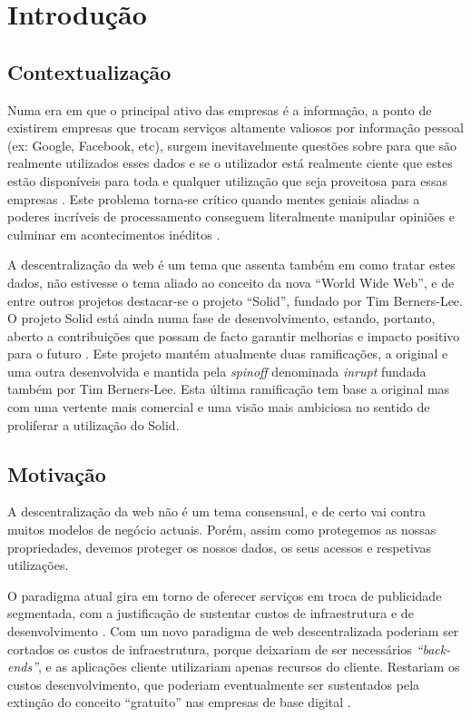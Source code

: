 \chapter{Introdução}
\label{cap:1}

\section{Contextualização}
Numa era em que o principal ativo das empresas é a informação, a ponto de existirem empresas que trocam serviços altamente valiosos por informação pessoal (ex: Google, Facebook, etc)\cite{top_three_issues_centralized_web}, surgem inevitavelmente questões sobre para que são realmente utilizados esses dados e se o utilizador está realmente ciente que estes estão disponíveis para toda e qualquer utilização que seja proveitosa para essas empresas \cite{facebook_data_hell_medium}. Este problema torna-se crítico quando mentes geniais aliadas a poderes incríveis de processamento conseguem literalmente manipular opiniões e culminar em acontecimentos inéditos \cite{cambridge_analytica}.

A descentralização da web é um tema que assenta também em como tratar estes dados, não estivesse o tema aliado ao conceito da nova “World Wide Web”, e de entre outros projetos destacar-se o projeto “Solid”, fundado por Tim Berners-Lee. O projeto Solid está ainda numa fase de desenvolvimento, estando, portanto, aberto a contribuições que possam de facto garantir melhorias e impacto positivo para o futuro \cite{why_web_decentralization_future}. Este projeto mantém atualmente duas ramificações, a original e uma outra desenvolvida e mantida pela \emph{spinoff} denominada \emph{inrupt} fundada também por Tim Berners-Lee. Esta última ramificação tem base a original mas com uma vertente mais comercial e uma visão mais ambiciosa no sentido de proliferar a utilização do Solid.

\section{Motivação}
A descentralização da web não é um tema consensual, e de certo vai contra muitos modelos de negócio actuais. Porém, assim como protegemos as nossas propriedades, devemos proteger os nossos dados, os seus acessos e respetivas utilizações.

O paradigma atual gira em torno de oferecer serviços em troca de publicidade segmentada, com a justificação de sustentar custos de infraestrutura e de desenvolvimento \cite{top_three_issues_centralized_web}. Com um novo paradigma de web descentralizada poderiam ser cortados os custos de infraestrutura, porque deixariam de ser necessários \emph{“back-ends”}, e as aplicações cliente utilizariam apenas recursos do cliente. Restariam os custos desenvolvimento, que poderiam eventualmente ser sustentados pela extinção do conceito “gratuito” nas empresas de base digital \cite{why_web_decentralization_future}.

